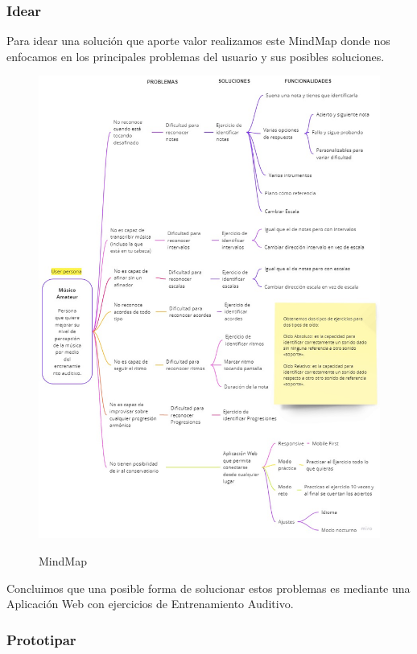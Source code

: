 \documentclass[12pt,twoside,titlepage]{report}
\begin{document}
\subsubsection{Idear}

Para idear una solución que aporte valor realizamos este MindMap donde nos enfocamos en los principales problemas del usuario y sus posibles soluciones.

\begin{figure}[H]
    \centering
    \includegraphics[scale=0.47]{Design Thinking/MindMap}
    \label{fig:Mindmap}
    \caption{MindMap}
\end{figure}

Concluimos que una posible forma de solucionar estos problemas es mediante una Aplicación Web con ejercicios de Entrenamiento Auditivo. 


\subsubsection{Prototipar}
\end{document}
